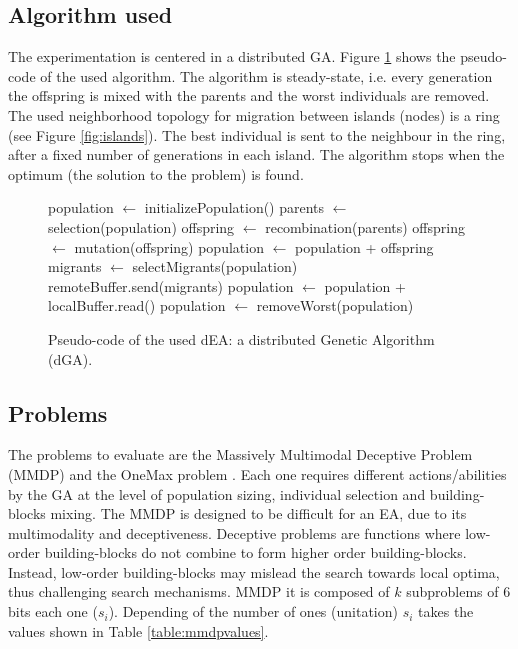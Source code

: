 \documentclass[final,1p,times]{elsarticle}
\begin{document}
\subsection{Algorithm used}
The experimentation is centered in a distributed GA. Figure \ref{fig:EA} shows the pseudo-code of the used algorithm. %
The algorithm is steady-state, i.e. every generation the offspring is mixed with the parents and the worst individuals are removed. The used neighborhood topology for migration between islands (nodes) is a ring (see Figure \ref{fig:islands}). The best individual is sent to the neighbour in the ring, after a fixed number of generations in each island. The algorithm stops when the optimum (the solution to the problem) is found.  %



\begin{figure}[htb]

\begin{algorithmic}
\STATE population $\gets$ initializePopulation()
    \STATE parents $\gets$ selection(population)
    \STATE offspring $\gets$ recombination(parents)
    \STATE offspring $\gets$ mutation(offspring)
    \STATE population $\gets$ population + offspring
      \STATE migrants $\gets$ selectMigrants(population)
      \STATE remoteBuffer.send(migrants)
    \ENDIF
      \STATE population $\gets$ population + localBuffer.read()
    \ENDIF
    \STATE population $\gets$ removeWorst(population)
\ENDWHILE

\end{algorithmic}
\caption{Pseudo-code of the used dEA: a distributed Genetic Algorithm (dGA).}
\label{fig:EA}
\end{figure}




\subsection{Problems}
The problems to evaluate are the Massively Multimodal Deceptive Problem (MMDP) \cite{goldberg92massive} and the OneMax problem \cite{ONEMAX}. Each one requires different actions/abilities by the GA at the level of population sizing, individual selection and building-blocks mixing. The MMDP
 is designed to be difficult for an EA, due to
its multimodality and deceptiveness. Deceptive problems are functions where low-order building-blocks do not combine to form higher order building-blocks. Instead, low-order building-blocks may mislead the search towards local optima, thus challenging search mechanisms. MMDP it is composed of $k$ subproblems of 6 bits each one ($s_i$). Depending of
the number of ones (unitation) $s_i$ takes the values shown in Table \ref{table:mmdpvalues}.  
\end{document}
